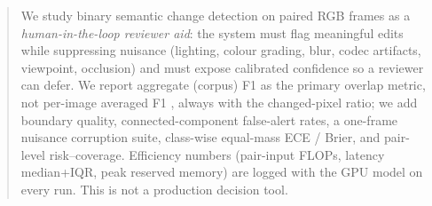 \begin{abstract}
We study binary semantic change detection on paired RGB frames as a
\emph{human-in-the-loop reviewer aid}: the system must flag meaningful
edits while suppressing nuisance (lighting, colour grading, blur,
codec artifacts, viewpoint, occlusion) and must expose calibrated
confidence so a reviewer can defer. We report aggregate (corpus) F1 as
the primary overlap metric, not per-image averaged F1
\cite{corley_2024_reality}, always with the changed-pixel ratio; we
add boundary quality, connected-component false-alert rates, a
one-frame nuisance corruption suite, class-wise equal-mass ECE / Brier,
and pair-level risk--coverage. Efficiency numbers (pair-input FLOPs,
latency median+IQR, peak reserved memory) are logged with the GPU
model on every run. This is not a production decision tool.
\end{abstract}
